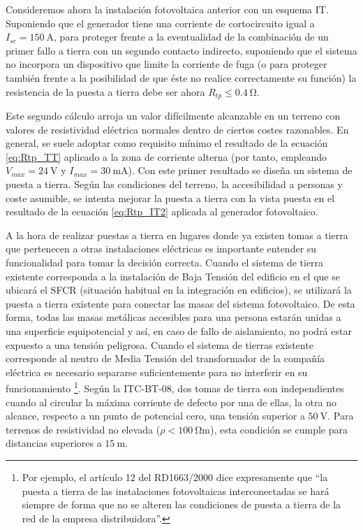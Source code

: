 Consideremos ahora la instalación fotovoltaica anterior con un esquema
IT. Suponiendo que el generador tiene una corriente de cortocircuito
igual a $I_{sc}=\SI{150}{\ampere}$, para proteger frente a la eventualidad
de la combinación de un primer fallo a tierra con un segundo contacto
indirecto, suponiendo que el sistema no incorpora un dispositivo que
limite la corriente de fuga (o para proteger también frente a la posibilidad
de que éste no realice correctamente su función) la resistencia de
la puesta a tierra debe ser ahora $R_{tp}\leq\SI{0.4}{\ohm}$.

Este segundo cálculo arroja un valor difícilmente alcanzable en un
terreno con valores de resistividad eléctrica normales dentro de ciertos
costes razonables. En general, se suele adoptar como requisito mínimo
el resultado de la ecuación \ref{eq:Rtp_TT} aplicado a la zona de
corriente alterna (por tanto, empleando $V_{max}=\SI{24}{\volt}$
y $I_{max}=\SI{30}{\milli\ampere}$). Con este primer resultado se
diseña un sistema de puesta a tierra. Según las condiciones del terreno,
la accesibilidad a personas y coste asumible, se intenta mejorar la
puesta a tierra con la vista puesta en el resultado de la ecuación
\ref{eq:Rtp_IT2} aplicada al generador fotovoltaico.

A la hora de realizar puestas a tierra en lugares donde ya existen
tomas a tierra que pertenecen a otras instalaciones eléctricas es
importante entender su funcionalidad para tomar la decisión correcta.
Cuando el sistema de tierra existente corresponda a la instalación
de Baja Tensión del edificio en el que se ubicará el SFCR (situación
habitual en la integración en edificios), se utilizará la puesta a
tierra existente para conectar las masas del sistema fotovoltaico.
De esta forma, todas las masas metálicas accesibles para una persona
estarán unidas a una superficie equipotencial y así, en caso de fallo
de aislamiento, no podrá estar expuesto a una tensión peligrosa. Cuando
el sistema de tierras existente corresponde al neutro de Media Tensión
del transformador de la compañía eléctrica es necesario separarse
suficientemente para no interferir en su funcionamiento%
\footnote{Por ejemplo, el artículo 12 del RD1663/2000 dice expresamente que
{}``la puesta a tierra de las instalaciones fotovoltaicas interconectadas
se hará siempre de forma que no se alteren las condiciones de puesta
a tierra de la red de la empresa distribuidora''.%
}. Según la ITC-BT-08, dos tomas de tierra son independientes cuando
al circular la máxima corriente de defecto por una de ellas, la otra
no alcance, respecto a un punto de potencial cero, una tensión superior
a $\SI{50}{\volt}$. Para terrenos de resistividad no elevada ($\rho<\SI{100}{\ohm\meter}$),
esta condición se cumple para distancias superiores a $\SI{15}{\meter}$.


